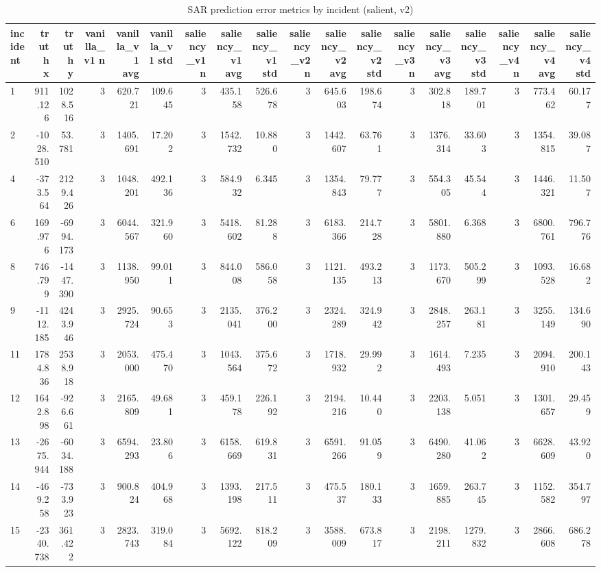 \begin{table}[ht]
\centering
\caption{SAR prediction error metrics by incident (salient, v2)}
\label{tab:sar-incident-errors-salient,-v2}
\begin{tabular}{lrrrrrrrrrrrrrrrrr}
\hline
incident & truth x & truth y & vanilla\_v1 n & vanilla\_v1 avg & vanilla\_v1 std & saliency\_v1 n & saliency\_v1 avg & saliency\_v1 std & saliency\_v2 n & saliency\_v2 avg & saliency\_v2 std & saliency\_v3 n & saliency\_v3 avg & saliency\_v3 std & saliency\_v4 n & saliency\_v4 avg & saliency\_v4 std \\
\hline
1 & 911.126 & 1028.516 & 3 & 620.721 & 109.645 & 3 & 435.158 & 526.678 & 3 & 645.603 & 198.674 & 3 & 302.818 & 189.701 & 3 & 773.462 & 60.177 \\
2 & -1028.510 & 53.781 & 3 & 1405.691 & 17.202 & 3 & 1542.732 & 10.880 & 3 & 1442.607 & 63.761 & 3 & 1376.314 & 33.603 & 3 & 1354.815 & 39.087 \\
4 & -373.564 & 2129.426 & 3 & 1048.201 & 492.136 & 3 & 584.932 & 6.345 & 3 & 1354.843 & 79.777 & 3 & 554.305 & 45.544 & 3 & 1446.321 & 11.507 \\
6 & 169.976 & -6994.173 & 3 & 6044.567 & 321.960 & 3 & 5418.602 & 81.288 & 3 & 6183.366 & 214.728 & 3 & 5801.880 & 6.368 & 3 & 6800.761 & 796.776 \\
8 & 746.799 & -1447.390 & 3 & 1138.950 & 99.011 & 3 & 844.008 & 586.058 & 3 & 1121.135 & 493.213 & 3 & 1173.670 & 505.299 & 3 & 1093.528 & 16.682 \\
9 & -1112.185 & 4243.946 & 3 & 2925.724 & 90.653 & 3 & 2135.041 & 376.200 & 3 & 2324.289 & 324.942 & 3 & 2848.257 & 263.181 & 3 & 3255.149 & 134.690 \\
11 & 1784.836 & 2538.918 & 3 & 2053.000 & 475.470 & 3 & 1043.564 & 375.672 & 3 & 1718.932 & 29.992 & 3 & 1614.493 & 7.235 & 3 & 2094.910 & 200.143 \\
12 & 1642.898 & -926.661 & 3 & 2165.809 & 49.681 & 3 & 459.178 & 226.192 & 3 & 2194.216 & 10.440 & 3 & 2203.138 & 5.051 & 3 & 1301.657 & 29.459 \\
13 & -2675.944 & -6034.188 & 3 & 6594.293 & 23.806 & 3 & 6158.669 & 619.831 & 3 & 6591.266 & 91.059 & 3 & 6490.280 & 41.062 & 3 & 6628.609 & 43.920 \\
14 & -469.258 & -733.923 & 3 & 900.824 & 404.968 & 3 & 1393.198 & 217.511 & 3 & 475.537 & 180.133 & 3 & 1659.885 & 263.745 & 3 & 1152.582 & 354.797 \\
15 & -2340.738 & 361.422 & 3 & 2823.743 & 319.084 & 3 & 5692.122 & 818.209 & 3 & 3588.009 & 673.817 & 3 & 2198.211 & 1279.832 & 3 & 2866.608 & 686.278 \\

\end{tabular}
\end{table}
